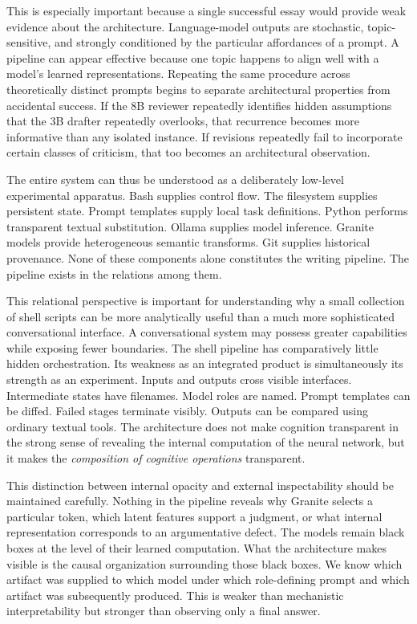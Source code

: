 \documentclass[11pt]{article}
\begin{document}
This is especially important because a single successful essay would provide weak evidence about the architecture. Language-model outputs are stochastic, topic-sensitive, and strongly conditioned by the particular affordances of a prompt. A pipeline can appear effective because one topic happens to align well with a model's learned representations. Repeating the same procedure across theoretically distinct prompts begins to separate architectural properties from accidental success. If the 8B reviewer repeatedly identifies hidden assumptions that the 3B drafter repeatedly overlooks, that recurrence becomes more informative than any isolated instance. If revisions repeatedly fail to incorporate certain classes of criticism, that too becomes an architectural observation.

The entire system can thus be understood as a deliberately low-level experimental apparatus. Bash supplies control flow. The filesystem supplies persistent state. Prompt templates supply local task definitions. Python performs transparent textual substitution. Ollama supplies model inference. Granite models provide heterogeneous semantic transforms. Git supplies historical provenance. None of these components alone constitutes the writing pipeline. The pipeline exists in the relations among them.

This relational perspective is important for understanding why a small collection of shell scripts can be more analytically useful than a much more sophisticated conversational interface. A conversational system may possess greater capabilities while exposing fewer boundaries. The shell pipeline has comparatively little hidden orchestration. Its weakness as an integrated product is simultaneously its strength as an experiment. Inputs and outputs cross visible interfaces. Intermediate states have filenames. Model roles are named. Prompt templates can be diffed. Failed stages terminate visibly. Outputs can be compared using ordinary textual tools. The architecture does not make cognition transparent in the strong sense of revealing the internal computation of the neural network, but it makes the \emph{composition of cognitive operations} transparent.

This distinction between internal opacity and external inspectability should be maintained carefully. Nothing in the pipeline reveals why Granite selects a particular token, which latent features support a judgment, or what internal representation corresponds to an argumentative defect. The models remain black boxes at the level of their learned computation. What the architecture makes visible is the causal organization surrounding those black boxes. We know which artifact was supplied to which model under which role-defining prompt and which artifact was subsequently produced. This is weaker than mechanistic interpretability but stronger than observing only a final answer.
\end{document}
